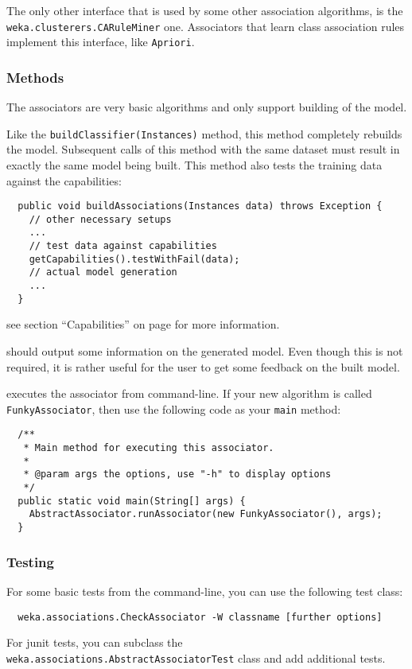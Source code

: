 The only other interface that is used by some other association algorithms, is
the \texttt{weka.clusterers.CARuleMiner} one. Associators that learn class
association rules implement this interface, like \texttt{Apriori}.

\subsubsection*{Methods}
The associators are very basic algorithms and only support building of the
model.

Like the \texttt{buildClassifier(Instances)} method, this method completely
rebuilds the model. Subsequent calls of this method with the same dataset must
result in exactly the same model being built. This method also tests the
training data against the capabilities:
\begin{verbatim}
  public void buildAssociations(Instances data) throws Exception {
    // other necessary setups
    ...
    // test data against capabilities
    getCapabilities().testWithFail(data);
    // actual model generation
    ...
  }
\end{verbatim}

see section ``Capabilities'' on page \pageref{classifier_capabilities} for more
information.

should output some information on the generated model. Even though this is not
required, it is rather useful for the user to get some feedback on the built
model.

\newpage
{}
executes the associator from command-line. If your new algorithm is called
\texttt{FunkyAssociator}, then use the following code as your \texttt{main}
method:
\begin{verbatim}
  /**
   * Main method for executing this associator.
   *
   * @param args the options, use "-h" to display options
   */
  public static void main(String[] args) {
    AbstractAssociator.runAssociator(new FunkyAssociator(), args);
  }
\end{verbatim}

\subsubsection*{Testing}
For some basic tests from the command-line, you can use the following test
class:
\begin{verbatim}
  weka.associations.CheckAssociator -W classname [further options]
\end{verbatim}
For junit tests, you can subclass the
\texttt{weka.associations.AbstractAssociatorTest} class and add additional
tests.
